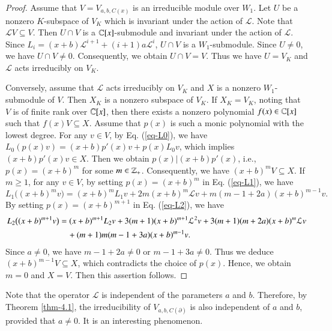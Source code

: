 \documentclass[12pt]{amsart}
\begin{document}
\begin{proof} Assume that $V=V_{a,b,C(x)}$ is an irreducible module over $W_1$.
Let $U$ be a nonzero $K$-subspace of $V_K$ which is invariant under the action of $\mathcal{L}$. Note that $\mathcal{L}V\subseteq V$.
Then $U\cap V$ is a $\mathbb{C}[x]$-submodule and invariant under the action of $\mathcal{L}$.
Since $L_i=(x+b)\mathcal{L}^{i+1}+(i+1)a\mathcal{L}^i$, $U\cap V$ is a $W_1$-submodule. Since $U\neq 0$, we have $U\cap V\neq 0$. Consequently, we obtain $U\cap V=V$. Thus we have $U=V_K$ and $\mathcal{L}$ acts irreducibly on $V_K$.

Conversely, assume that $\mathcal{L}$ acts irreducibly on $V_K$ and $X$ is a nonzero $W_1$-submodule of $V$. Then $X_K$ is a nonzero subspace of $V_K$.
If $X_K=V_K$, noting that $V$ is of finite rank over $\mathbb{C}[x]$, then there exists a nonzero polynomial $f(x)\in\mathbb{C}[x]$ such that $f(x)V\subseteq X$.
Assume that $p(x)$ is such a monic polynomial with the lowest degree.
For any $v\in V$, by Eq. (\ref{eq-L0}), we have $L_0(p(x)v)=(x+b)p'(x)v+p(x)L_0v$, which implies $(x+b)p'(x)v\in X$. Then we obtain $p(x)|(x+b)p'(x)$, i.e., $p(x)=(x+b)^m$ for some $m\in\mathbb{Z}_+$. Consequently, we have $(x+b)^mV\subseteq X$. If $m\geq1$, for any $v\in V$,
by setting $p(x)=(x+b)^m$ in
Eq. (\ref{eq-L1}), we have
\begin{equation*}
L_1\bigl((x+b)^m v\bigr) = (x+b)^m L_1 v + 2m (x+b)^m\mathcal{L}v + m(m-1+2a)(x+b)^{m-1} v.
\end{equation*}
By setting $p(x)=(x+b)^{m+1}$ in
Eq. (\ref{eq-L2}), we have
\begin{equation*}
\aligned
L_2\bigl((x+b)^{m+1} v\bigr)&=(x+b)^{m+1} L_2 v+3(m+1) (x+b)^{m+1}\mathcal{L}^2 v
+ 3(m+1)(m+2a)(x+b)^{m} \mathcal{L} v\\
&\quad + (m+1)m(m-1+3a)(x+b)^{m-1} v.
\endaligned
\end{equation*}
Since $a\neq 0$, we have $m-1+2a\neq0$ or $m-1+3a\neq 0$. Thus we deduce $(x+b)^{m-1}V\subseteq X$, which contradicts the choice of $p(x)$. Hence, we obtain $m=0$ and
$X=V$. Then this assertion follows.
\end{proof}
\begin{rmk}\label{rmk-4.2}
Note that the operator $\mathcal{L}$ is independent of the parameters $a$ and $b$. Therefore,  by Theorem \ref{thm-4.1}, the irreducibility of $V_{a,b,C(\partial)}$
is also independent of $a$ and $b$, provided that $a\neq 0$. It is an interesting phenomenon.
\end{rmk}
\end{document}
